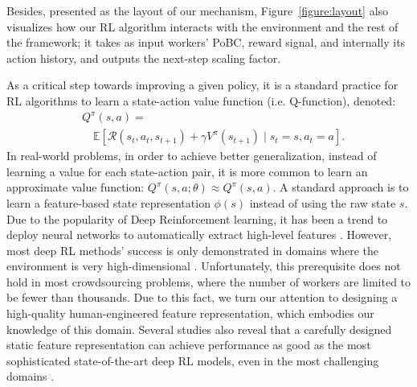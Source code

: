 Besides, presented as the layout of our mechanism, Figure~\ref{figure:layout} also visualizes how our RL algorithm interacts with the environment and the rest of the framework;  it takes as input workers' PoBC, reward signal, and internally its action history, and outputs the next-step scaling factor.

 
As a critical step towards improving a given policy, it is a standard practice for RL algorithms to learn a state-action value function (i.e. Q-function), denoted:
\begin{equation*}
\begin{split}
&Q^\pi(s,a) =\\
& \quad\mathbb{E}\left[ \mathcal{R}(s_t,a_t,s_{t+1}) + \gamma V^\pi(s_{t+1}) \mid s_t = s, a_t = a \right].
\end{split}
\end{equation*}
In real-world problems, in order to achieve better generalization, instead of learning a value for each state-action pair, it is more common to learn an approximate value function: $Q^\pi(s,a; \theta) \approx Q^\pi(s,a)$. A standard approach is to learn a feature-based state representation $\phi(s)$ instead of using the raw state $s$. Due to the popularity of Deep Reinforcement learning, it has been a trend to deploy neural networks to automatically extract high-level features \citep{Silver17,Mnih15}. 
However, most deep RL methods' success is only demonstrated in domains where the environment is very high-dimensional \citep{}. Unfortunately, this prerequisite does not hold in most crowdsourcing problems, where the number of workers are limited to be fewer than thousands. Due to this fact, we turn our attention to designing a high-quality human-engineered feature representation, which embodies our knowledge of this domain. Several studies also reveal that a carefully designed static feature representation can achieve performance as good as the most sophisticated state-of-the-art deep RL models, even in the most challenging domains \citep{Liang16}.

